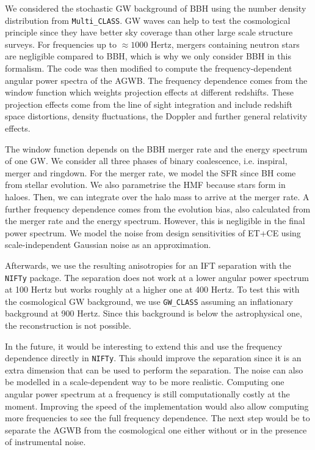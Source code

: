 We considered the stochastic GW background of BBH using the number density distribution from {\tt Multi\_CLASS}. GW waves can help to test the cosmological principle since they have better sky coverage than other large scale structure surveys. For frequencies up to $\approx 1000$ Hertz, mergers containing neutron stars are negligible compared to BBH, which is why we only consider BBH in this formalism.
The code was then modified to compute the frequency-dependent angular power spectra of the AGWB. The frequency dependence comes from the window function which weights projection effects at different redshifts. These projection effects come from the line of sight integration and include redshift space distortions, density fluctuations, the Doppler and further general relativity effects. 

The window function depends on the BBH merger rate and the energy spectrum of one GW. We consider all three phases of binary coalescence, i.e. inspiral, merger and ringdown. For the merger rate, we model the SFR since BH come from stellar evolution. We also parametrise the HMF because stars form in haloes. Then, we can integrate over the halo mass to arrive at the merger rate. 
A further frequency dependence comes from the evolution bias, also calculated from the merger rate and the energy spectrum. However, this is negligible in the final power spectrum.
We model the noise from design sensitivities of ET+CE using scale-independent Gaussian noise as an approximation.

Afterwards, we use the resulting anisotropies for an IFT separation with the {\tt NIFTy} package. The separation does not work at a lower angular power spectrum at 100 Hertz but works roughly at a higher one at 400 Hertz.
To test this with the cosmological GW background, we use {\tt GW\_CLASS} assuming an inflationary background at 900 Hertz. Since this background is below the astrophysical one, the reconstruction is not possible.

In the future, it would be interesting to extend this and use the frequency dependence directly in {\tt NIFTy}. This should improve the separation since it is an extra dimension that can be used to perform the separation. The noise can also be modelled in a scale-dependent way to be more realistic. Computing one angular power spectrum at a frequency is still computationally costly at the moment. Improving the speed of the implementation would also allow computing more frequencies to see the full frequency dependence.
The next step would be to separate the AGWB from the cosmological one either without or in the presence of instrumental noise.